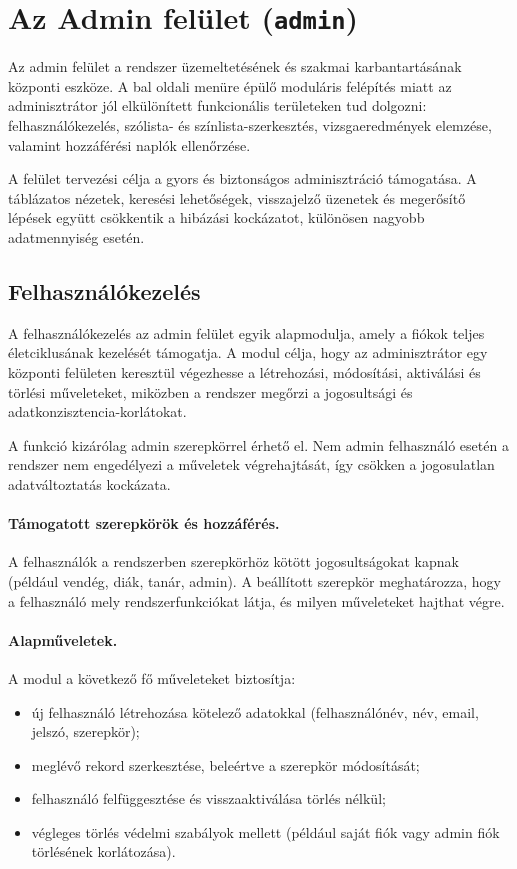 \documentclass{thesis-ekf}
\begin{document}
\section{Az Admin felület (\texttt{admin})}

Az admin felület a rendszer üzemeltetésének és szakmai karbantartásának központi eszköze. A bal oldali menüre épülő moduláris felépítés miatt az adminisztrátor jól elkülönített funkcionális területeken tud dolgozni: felhasználókezelés, szólista- és színlista-szerkesztés, vizsgaeredmények elemzése, valamint hozzáférési naplók ellenőrzése.

A felület tervezési célja a gyors és biztonságos adminisztráció támogatása. A táblázatos nézetek, keresési lehetőségek, visszajelző üzenetek és megerősítő lépések együtt csökkentik a hibázási kockázatot, különösen nagyobb adatmennyiség esetén.

\subsection{Felhasználókezelés}
A felhasználókezelés az admin felület egyik alapmodulja, amely a fiókok teljes életciklusának kezelését támogatja. A modul célja, hogy az adminisztrátor egy központi felületen keresztül végezhesse a létrehozási, módosítási, aktiválási és törlési műveleteket, miközben a rendszer megőrzi a jogosultsági és adatkonzisztencia-korlátokat.

A funkció kizárólag admin szerepkörrel érhető el. Nem admin felhasználó esetén a rendszer nem engedélyezi a műveletek végrehajtását, így csökken a jogosulatlan adatváltoztatás kockázata.

\paragraph{Támogatott szerepkörök és hozzáférés.}
A felhasználók a rendszerben szerepkörhöz kötött jogosultságokat kapnak (például vendég, diák, tanár, admin). A beállított szerepkör meghatározza, hogy a felhasználó mely rendszerfunkciókat látja, és milyen műveleteket hajthat végre.

\paragraph{Alapműveletek.}
A modul a következő fő műveleteket biztosítja:
\begin{itemize}
  \item új felhasználó létrehozása kötelező adatokkal (felhasználónév, név, email, jelszó, szerepkör);
  \item meglévő rekord szerkesztése, beleértve a szerepkör módosítását;
  \item felhasználó felfüggesztése és visszaaktiválása törlés nélkül;
  \item végleges törlés védelmi szabályok mellett (például saját fiók vagy admin fiók törlésének korlátozása).
\end{itemize}
\end{document}
